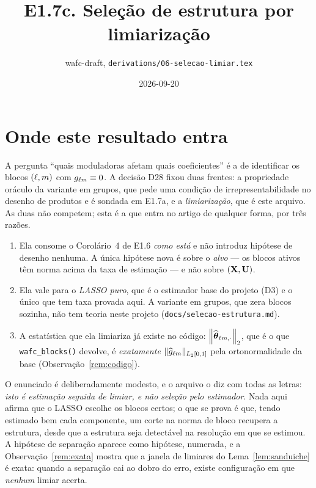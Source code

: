 \documentclass[11pt,a4paper]{article}
\title{E1.7c. Seleção de estrutura por limiarização}
\author{wafc-draft, \texttt{derivations/06-selecao-limiar.tex}}
\date{2026-09-20}
\newcommand{\ghat}[2]{\widehat{g}_{#1#2}}
\begin{document}
\maketitle

\section*{Onde este resultado entra}

A pergunta ``quais moduladoras afetam quais coeficientes'' é a de identificar
os blocos $(\ell,m)$ com $g_{\ell m} \equiv 0$. A decisão D28 fixou
duas frentes: a propriedade oráculo da variante em grupos, que pede uma
condição de irrepresentabilidade no desenho de produtos e é sondada em E1.7a,
e a \emph{limiarização}, que é este arquivo. As duas não competem; esta é a
que entra no artigo de qualquer forma, por três razões.

\begin{enumerate}[label=(\alph*), leftmargin=*, nosep]
  \item Ela consome o Corolário~4 de E1.6 \emph{como está} e não introduz
    hipótese de desenho nenhuma. A única hipótese nova é sobre o
    \emph{alvo} --- os blocos ativos têm norma acima da taxa de estimação ---
    e não sobre $(\mathbf{X},\mathbf{U})$.
  \item Ela vale para o \emph{LASSO puro}, que é o estimador base do projeto
    (D3) e o único que tem taxa provada aqui. A variante em grupos, que
    zera blocos sozinha, não tem teoria neste projeto
    (\texttt{docs/selecao-estrutura.md}).
  \item A estatística que ela limiariza já existe no código:
    $\left\lVert \widehat{\boldsymbol{\theta}}_{\ell m,\cdot} \right\rVert_{2}$, que é o que
    \texttt{wafc\_blocks()} devolve, é \emph{exatamente}
    $\lVert\ghat{\cv}{\md}\rVert_{L_{2}[0,1]}$ pela ortonormalidade da base
    (Observação~\ref{rem:codigo}).
\end{enumerate}

O enunciado é deliberadamente modesto, e o arquivo o diz com todas as letras:
\emph{isto é estimação seguida de limiar, e não seleção pelo estimador}. Nada
aqui afirma que o LASSO escolhe os blocos certos; o que se prova é que, tendo
estimado bem cada componente, um corte na norma de bloco recupera a estrutura,
desde que a estrutura seja detectável na resolução em que se estimou. A
hipótese de separação aparece como hipótese, numerada, e a
Observação~\ref{rem:exata} mostra que a janela de limiares do
Lema~\ref{lem:sanduiche} é exata: quando a separação cai ao dobro do erro,
existe configuração em que \emph{nenhum} limiar acerta.
\end{document}
